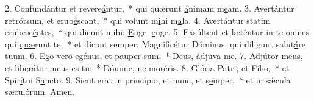 2. Confundántur et revere\uline{á}ntur,~* qui quærunt \uline{á}nimam m\uline{e}am.
3. Avertántur retrórsum, et erub\uline{é}scant,~* qui volunt m\uline{i}hi m\uline{a}la.
4. Avertántur statim erubesc\uline{é}ntes,~* qui dicunt mihi: \uline{E}uge, \uline{e}uge.
5. Exsúltent et læténtur in te omnes qui \uline{quæ}runt te,~* et dicant semper: Magnificétur Dóminus: qui díligunt salut\uline{á}re t\uline{u}um.
6. Ego vero egénus, et p\uline{au}per sum:~* Deus, \uline{á}djuv\uline{a} me.
7. Adjútor meus, et liberátor meus \uline{e}s tu:~* Dómine, n\uline{e} mor\uline{é}ris.
8. Glória Patri, et F\uline{í}lio,~* et Spir\uline{í}tui S\uline{a}ncto.
9. Sicut erat in princípio, et nunc, et s\uline{e}mper,~* et in sǽcula sæcul\uline{ó}rum. \uline{A}men.

